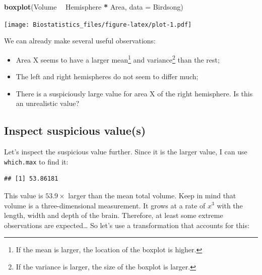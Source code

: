 \documentclass[
]{book}
\newenvironment{Shaded}{\begin{snugshade}}{\end{snugshade}}
\newcommand{\DataTypeTok}[1]{\textcolor[rgb]{0.13,0.29,0.53}{#1}}
\newcommand{\KeywordTok}[1]{\textcolor[rgb]{0.13,0.29,0.53}{\textbf{#1}}}
\newcommand{\NormalTok}[1]{#1}
\newcommand{\OperatorTok}[1]{\textcolor[rgb]{0.81,0.36,0.00}{\textbf{#1}}}
\newcommand{\StringTok}[1]{\textcolor[rgb]{0.31,0.60,0.02}{#1}}
\providecommand{\tightlist}{%
  \setlength{\itemsep}{0pt}\setlength{\parskip}{0pt}}
\begin{document}
\begin{Shaded}
\begin{Highlighting}[]
\KeywordTok{boxplot}\NormalTok{(Volume }\OperatorTok{~}\StringTok{ }\NormalTok{Hemisphere }\OperatorTok{*}\StringTok{ }\NormalTok{Area, }\DataTypeTok{data =}\NormalTok{ Birdsong)}
\end{Highlighting}
\end{Shaded}

\texttt{[image: Biostatistics\_files/figure-latex/plot-1.pdf]}

We can already make several useful observations:

\begin{itemize}
\tightlist
\item
  Area X seems to have a larger mean\footnote{If the mean is larger, the location of the boxplot is higher.} and variance\footnote{If the variance is larger, the size of the boxplot is larger.} than the rest;
\item
  The left and right hemispheres do not seem to differ much;
\item
  There is a suspiciously large value for area X of the right hemisphere. Is this an unrealistic value?
\end{itemize}

\hypertarget{inspect-suspicious-values}{%
\subsection{Inspect suspicious value(s)}\label{inspect-suspicious-values}}

Let's inspect the suspicious value further. Since it is the larger value, I can use \texttt{which.max} to find it:

\begin{Shaded}
\end{Shaded}

\begin{verbatim}
## [1] 53.86181
\end{verbatim}

This value is \(53.9 \times\) larger than the mean total volume. Keep in mind that volume is a three-dimensional measurement. It grows at a rate of \(x^3\) with the length, width and depth of the brain. Therefore, at least some extreme observations are expected\ldots{} So let's use a transformation that accounts for this:
\end{document}
